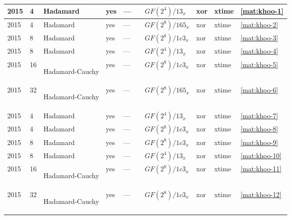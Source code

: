 \begin{footnotesize}
\begin{longtable}[c]{|l|l|l|l|l|l|l|l|l|l|}
2015 & 4 & Hadamard & yes & --- & \cite{LwInvolKhoo2015} & $GF(2^4)/13_x$ & xor & xtime & \eqref{mat:khoo-1} \\ \hline
2015 & 4 & Hadamard & yes & --- & \cite{LwInvolKhoo2015} & $GF(2^8)/165_x$ & xor & xtime & \eqref{mat:khoo-2} \\ \hline
2015 & 8 & Hadamard & yes & --- & \cite{LwInvolKhoo2015} & $GF(2^8)/1c3_x$ & xor & xtime & \eqref{mat:khoo-3} \\ \hline
2015 & 8 & Hadamard & yes & --- & \cite{LwInvolKhoo2015} & $GF(2^4)/13_x$ & xor & xtime & \eqref{mat:khoo-4} \\ \hline
2015 & 16 & \begin{tiny}Hadamard-Cauchy\end{tiny} & yes & --- & \cite{LwInvolKhoo2015} & $GF(2^8)/1c3_x$ & xor & xtime & \eqref{mat:khoo-5} \\ \hline
2015 & 32 & \begin{tiny}Hadamard-Cauchy\end{tiny} & yes & --- & \cite{LwInvolKhoo2015} & $GF(2^8)/165_x$ & xor & xtime & \eqref{mat:khoo-6} \\ \hline


2015 & 4 & Hadamard & yes & --- & \cite{LwInvolKhoo2015} & $GF(2^4)/13_x$ & xor & xtime & \eqref{mat:khoo-7} \\ \hline
2015 & 4 & Hadamard & yes & --- & \cite{LwInvolKhoo2015} & $GF(2^8)/1c3_x$ & xor & xtime & \eqref{mat:khoo-8} \\ \hline
2015 & 8 & Hadamard & yes & --- & \cite{LwInvolKhoo2015} & $GF(2^8)/1c3_x$ & xor & xtime & \eqref{mat:khoo-9} \\ \hline
2015 & 8 & Hadamard & yes & --- & \cite{LwInvolKhoo2015} & $GF(2^4)/13_x$ & xor & xtime & \eqref{mat:khoo-10} \\ \hline
2015 & 16 & \begin{tiny}Hadamard-Cauchy\end{tiny} & yes & --- & \cite{LwInvolKhoo2015} & $GF(2^8)/1c3_x$ & xor & xtime & \eqref{mat:khoo-11} \\ \hline
2015 & 32 & \begin{tiny}Hadamard-Cauchy\end{tiny} & yes & --- & \cite{LwInvolKhoo2015} & $GF(2^8)/1c3_x$ & xor & xtime & \eqref{mat:khoo-12} \\ \hline



\end{longtable}
\end{footnotesize}
